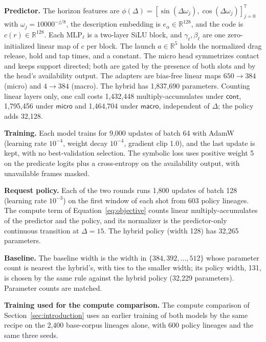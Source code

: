 \textbf{Predictor.} The horizon features are $\phi(\Delta)=[\sin(\Delta\omega_j),\cos(\Delta\omega_j)]_{j=0}^{7}$ with $\omega_j=10000^{-j/8}$, the description embedding is $e_\alpha\in\mathbb{R}^{128}$, and the code is $c(r)\in\mathbb{R}^{128}$. Each $\mathrm{MLP}_\ell$ is a two-layer SiLU block, and $\gamma_\ell,\beta_\ell$ are one zero-initialized linear map of $c$ per block. The launch $a\in\mathbb{R}^5$ holds the normalized drag release, hold and tap times, and a constant. The micro head symmetrizes contact and keeps support directed; both are gated by the presence of both slots and by the head's availability output. The adapters are bias-free linear maps $650\to384$ (micro) and $4\to384$ (macro). The hybrid has 1,837,690 parameters. Counting linear layers only, one call costs 1,432,448 multiply-accumulates under $\textsf{cont}$, 1,795,456 under $\textsf{micro}$ and 1,464,704 under $\textsf{macro}$, independent of $\Delta$; the policy adds 32,128.

\textbf{Training.} Each model trains for 9,000 updates of batch 64 with AdamW (learning rate $10^{-4}$, weight decay $10^{-4}$, gradient clip 1.0), and the last update is kept, with no best-validation selection. The symbolic loss uses positive weight 5 on the predicate logits plus a cross-entropy on the availability output, with unavailable frames masked.

\textbf{Request policy.} Each of the two rounds runs 1,800 updates of batch 128 (learning rate $10^{-3}$) on the first window of each shot from 603 policy lineages. The compute term of Equation~\ref{eq:objective} counts linear multiply-accumulates of the predictor and the policy, and its normalizer is the predictor-only continuous transition at $\Delta=15$. The hybrid policy (width 128) has 32,265 parameters.

\textbf{Baseline.} The baseline width is the width in $\{384,392,\dots,512\}$ whose parameter count is nearest the hybrid's, with ties to the smaller width; its policy width, 131, is chosen by the same rule against the hybrid policy (32,229 parameters). Parameter counts are matched.

\textbf{Training used for the compute comparison.} The compute comparison of Section~\ref{sec:introduction} uses an earlier training of both models by the same recipe on the 2,400 base-corpus lineages alone, with 600 policy lineages and the same three seeds.


